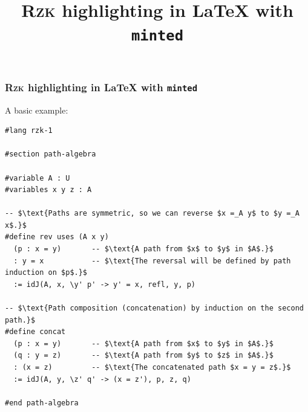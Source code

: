 \documentclass[aspectratio=169]{beamer}
\title{\textsc{Rzk} highlighting in LaTeX with \texttt{minted}}
\author{}
\date{}
\begin{document}
\begin{frame}[fragile]
  \frametitle{\textsc{Rzk} highlighting in LaTeX with \texttt{minted}}

A basic example:

\scriptsize
\begin{verbatim}
#lang rzk-1

#section path-algebra

#variable A : U
#variables x y z : A

-- $\text{Paths are symmetric, so we can reverse $x =_A y$ to $y =_A x$.}$
#define rev uses (A x y)
  (p : x = y)       -- $\text{A path from $x$ to $y$ in $A$.}$
  : y = x           -- $\text{The reversal will be defined by path induction on $p$.}$
  := idJ(A, x, \y' p' -> y' = x, refl, y, p)

-- $\text{Path composition (concatenation) by induction on the second path.}$
#define concat
  (p : x = y)       -- $\text{A path from $x$ to $y$ in $A$.}$
  (q : y = z)       -- $\text{A path from $y$ to $z$ in $A$.}$
  : (x = z)         -- $\text{The concatenated path $x = y = z$.}$
  := idJ(A, y, \z' q' -> (x = z'), p, z, q)

#end path-algebra
\end{verbatim}

\end{frame}
\end{document}
